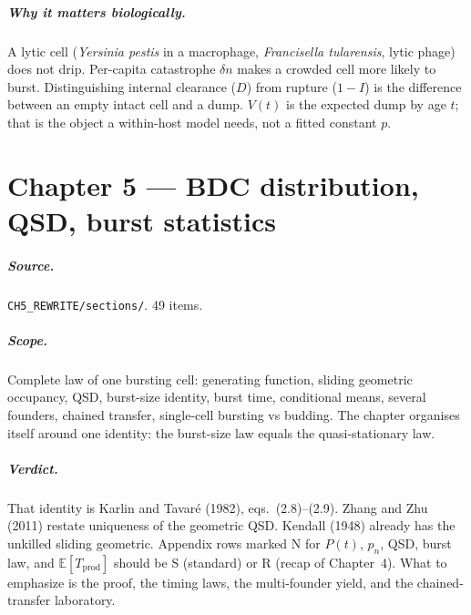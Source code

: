 \documentclass[11pt,a4paper]{report}
\newcommand{\yp}{\textit{Yersinia pestis}}
\newcommand{\ft}{\textit{Francisella tularensis}}
\begin{document}
\paragraph{Why it matters biologically.}
A lytic cell (\yp{} in a macrophage, \ft{}, lytic phage) does not drip.
Per-capita catastrophe \(\delta n\) makes a crowded cell more likely to
burst. Distinguishing internal clearance (\(D\)) from rupture (\(1-I\))
is the difference between an empty intact cell and a dump. \(V(t)\) is
the expected dump by age \(t\); that is the object a within-host model
needs, not a fitted constant \(p\).

\chapter{Chapter 5 --- BDC distribution, QSD, burst statistics}
\label{ch:5}

\paragraph{Source.} \texttt{CH5\_REWRITE/sections/}. 49 items.

\paragraph{Scope.}
Complete law of one bursting cell: generating function, sliding geometric
occupancy, QSD, burst-size identity, burst time, conditional means,
several founders, chained transfer, single-cell bursting vs budding. The
chapter organises itself around one identity: the burst-size law equals
the quasi-stationary law.

\paragraph{Verdict.}
That identity is Karlin and Tavar\'e (1982), eqs.~(2.8)--(2.9). Zhang and
Zhu (2011) restate uniqueness of the geometric QSD. Kendall (1948)
already has the unkilled sliding geometric. Appendix rows marked N for
\(P(t)\), \(p_n\), QSD, burst law, and \(\mathbb{E}[T_{\mathrm{prod}}]\)
should be S (standard) or R (recap of Chapter~4). What to emphasize is
the proof, the timing laws, the multi-founder yield, and the
chained-transfer laboratory.
\end{document}
